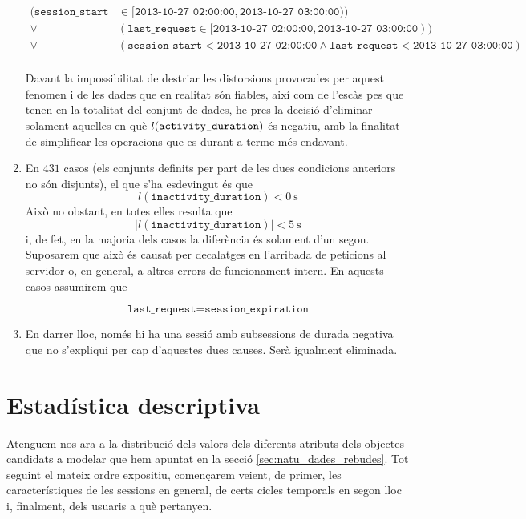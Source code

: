 \documentclass[
	a4paper,
	twoside,
	justified
]{tufte-book}
\begin{document}
\begin{enumerate}[(1)]
\begin{align*}
	 (\texttt{session\_start} & \in [\texttt{2013-10-27 02:00:00}, \texttt{2013-10-27 03:00:00})) \\
  \vee & (\texttt{last\_request} \in [\texttt{2013-10-27 02:00:00},\texttt{2013-10-27 03:00:00})) \\
 \vee & (\texttt{session\_start} < \texttt{2013-10-27 02:00:00} \wedge \texttt{last\_request} < \texttt{2013-10-27 03:00:00}) \\
\end{align*}

Davant la impossibilitat de destriar les distorsions provocades per aquest fenomen i de les dades que en realitat són fiables, així com de l'escàs pes que tenen en la totalitat del conjunt de dades, he pres la decisió d'eliminar solament aquelles en què $l(\texttt{activity\_duration})$ és negatiu, amb la finalitat de simplificar les operacions que es durant a terme més endavant. 

\item En $431$ casos (els conjunts definits per part de les dues condicions anteriors no són disjunts), el que s'ha esdevingut és que 
$$
	l(\texttt{inactivity\_duration}) < \SI{0}{\second}
$$
Això no obstant, en totes elles resulta que 
$$
	|l(\texttt{inactivity\_duration})| < \SI{5}{\second}
$$ 
i, de fet, en la majoria dels casos la diferència és solament d'un segon. Suposarem que això és causat per decalatges en l'arribada de peticions al servidor o, en general, a altres errors de funcionament intern. En aquests casos assumirem que 

$$
	\texttt{last\_request} = \texttt{session\_expiration}
$$

\item En darrer lloc, només hi ha una sessió amb subsessions de durada negativa que no s'expliqui per cap d'aquestes dues causes. Serà igualment eliminada.

\end{enumerate}


\chapter{Estadística descriptiva}

Atenguem-nos ara a la distribució dels valors dels diferents atributs dels objectes candidats a modelar que hem apuntat en la secció \ref{sec:natu_dades_rebudes}. Tot seguint el mateix ordre expositiu, començarem veient, de primer, les característiques de les sessions en general, de certs cicles temporals en segon lloc i, finalment, dels usuaris a què pertanyen. 
\end{document}
